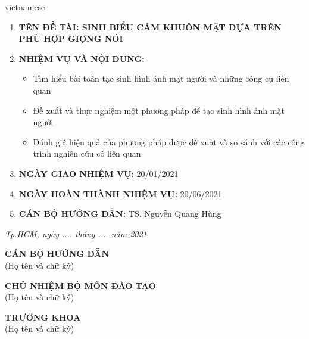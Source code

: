 \begin{titlepage}
\begin{otherlanguage*}{vietnamese}
\begin{flushleft}
        \renewcommand{\labelenumi}{\Roman{enumi}}
        \begin{enumerate}
            \item \textbf{TÊN ĐỀ TÀI: SINH BIỂU CẢM KHUÔN MẶT DỰA TRÊN PHÙ HỢP GIỌNG NÓI}
            \item \textbf{NHIỆM VỤ VÀ NỘI DUNG:}
            \begin{itemize}
                \item Tìm hiểu bài toán tạo sinh hình ảnh mặt người và những công cụ liên quan
                \item Đề xuất và thực nghiệm một phương pháp để tạo sinh hình ảnh mặt người
                \item Đánh giá hiệu quả của phương pháp được đề xuất và so sánh với các công trình nghiên cứu có liên quan
            \end{itemize}
            \item \textbf{NGÀY GIAO NHIỆM VỤ:} 20/01/2021
            \item \textbf{NGÀY HOÀN THÀNH NHIỆM VỤ:} 20/06/2021
            \item \textbf{CÁN BỘ HƯỚNG DẪN:} TS. Nguyễn Quang Hùng
        \end{enumerate}
    \end{flushleft}

    \begin{flushright}
        \textit{Tp.HCM, ngày .... tháng .... năm 2021}
    \end{flushright}

    \begin{center}
        \begin{minipage}[t]{0.40\textwidth}
            \center\textbf{CÁN BỘ HƯỚNG DẪN}\\
            (Họ tên và chữ ký)
            \vspace{3cm}
        \end{minipage}
        \noindent
        \begin{minipage}[t]{0.50\textwidth}
            \center\textbf{CHỦ NHIỆM BỘ MÔN ĐÀO TẠO}\\
            (Họ tên và chữ ký)
            \vspace{3cm}
        \end{minipage}
        \begin{minipage}[t]{0.90\textwidth}
            \center\textbf{TRƯỞNG KHOA}\\
            (Họ tên và chữ ký)
            \vspace{3cm}
        \end{minipage}
    \end{center}

\end{otherlanguage*}
\vfill
\end{titlepage}
